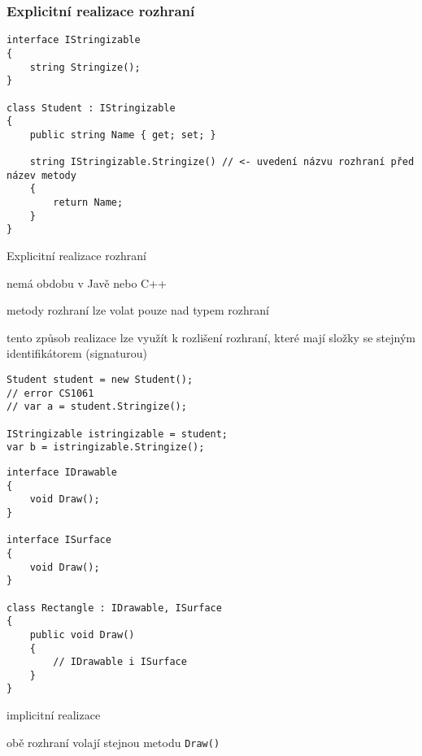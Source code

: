 \begin{frame}[fragile]
\frametitle{Explicitní realizace rozhraní}
\vfill
\begin{yesblock}
\begin{lstlisting}[basicstyle=\small]
interface IStringizable
{
    string Stringize();
}

class Student : IStringizable
{
    public string Name { get; set; }

    string IStringizable.Stringize() // <- uvedení názvu rozhraní před název metody
    {
        return Name;
    }
}
\end{lstlisting}
\end{yesblock}
\vfill
\end{frame}


\begin{frame}[fragile]
\vfill
\begin{bitemize}{Explicitní realizace rozhraní}
\item nemá obdobu v Javě nebo C++
\item metody rozhraní lze volat pouze nad typem rozhraní
\item tento způsob realizace lze využít k rozlišení rozhraní, které mají složky se stejným identifikátorem (signaturou)
\end{bitemize}
\vfill
\begin{yesblock}
\begin{lstlisting}[basicstyle=\small]
Student student = new Student();
// error CS1061
// var a = student.Stringize();

IStringizable istringizable = student;
var b = istringizable.Stringize();
\end{lstlisting}
\end{yesblock}
\vfill
\end{frame}







\begin{frame}[fragile]
\begin{yesblock}
\begin{lstlisting}[basicstyle=\small]
interface IDrawable
{
    void Draw();
}

interface ISurface
{
    void Draw();
}

class Rectangle : IDrawable, ISurface
{
    public void Draw()
    {
        // IDrawable i ISurface
    }
}
\end{lstlisting}
\end{yesblock}
\vfill
\begin{bitemize}{}
\item implicitní realizace
\item obě rozhraní volají stejnou metodu \lstinline|Draw()|
\end{bitemize}
\end{frame}


